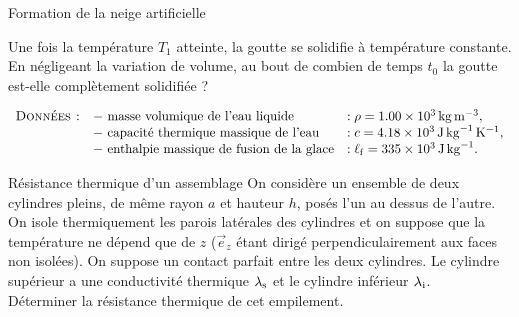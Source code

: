 \begin{exo}[PT][1][colle]{Formation de la neige artificielle}
\begin{quest}
\item Une fois la température $T_1$ atteinte, la goutte se solidifie à température constante. En négligeant la variation de volume, au bout de combien de temps $t_0$ la goutte est-elle complètement solidifiée ?


\end{quest}

\noindent $\begin{array}{lll}
\textsc{Données :}  & -\text{ masse volumique de l'eau liquide} & : \rho=\SI{1.00e3}{kg.m^{-3}}, \\
& - \text{ capacité thermique massique de l'eau} & : c=\SI{4.18e3}{J.kg^{-1}.K^{-1}}, \\
& - \text{ enthalpie massique de fusion de la glace} & : \ell_{\rm f}=\SI{335e3}{J.kg^{-1}}.

\end{array}
$

\end{exo}

\begin{exo}[PC][1]{Résistance thermique d'un assemblage}
On considère un ensemble de deux cylindres pleins, de même rayon $a$ et hauteur $h$, posés l'un au dessus de l'autre. On isole thermiquement les parois latérales des cylindres et on suppose que la température ne dépend que de $z$ ($\vec{e}_z$ étant dirigé perpendiculairement aux faces non isolées). On suppose un contact parfait entre les deux cylindres. Le cylindre supérieur a une conductivité thermique $\lambda_{\rm{s}}$ et le cylindre inférieur $\lambda_{\rm{i}}$.\\
Déterminer la résistance thermique de cet empilement.
\end{exo}


